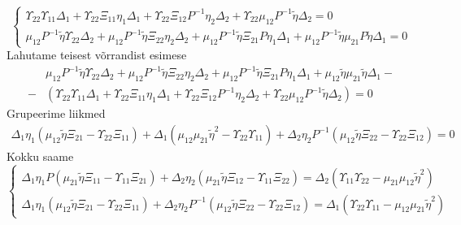 \documentclass[class=article, crop=false]{standalone}
\begin{document}
\begin{equation}\label{key}
	\begin{cases}
		\Upsilon_{22} \Upsilon_{11} \Delta_{1} + \Upsilon_{22} \Xi_{11} \eta_{ 1} \Delta_{1} + \Upsilon_{22} \Xi_{12} P^{-1} \eta_{ 2} \Delta_{2} + \Upsilon_{22} \mu_{12} P^{ -1} \tilde{ \eta} \Delta_{2} = 0 \\
		\mu_{12} P^{-1} \tilde{ \eta} \Upsilon_{22} \Delta_{2} + \mu_{12} P^{-1} \tilde{ \eta} \Xi_{22} \eta_{ 2} \Delta_{2} + \mu_{12} P^{-1} \tilde{ \eta} \Xi_{21} P \eta_{ 1} \Delta_{1} + \mu_{12} P^{-1} \tilde{ \eta} \mu_{21} P \tilde{ \eta} \Delta_{1} = 0
	\end{cases}
\end{equation}
Lahutame teisest võrrandist esimese
\begin{equation}\label{key}
	\begin{split}
		& \mu_{12} P^{-1} \tilde{ \eta} \Upsilon_{22} \Delta_{2} + \mu_{12} P^{-1} \tilde{ \eta} \Xi_{22} \eta_{ 2} \Delta_{2} + \mu_{12} P^{-1} \tilde{ \eta} \Xi_{21} P \eta_{ 1} \Delta_{1} + \mu_{12} \tilde{ \eta} \mu_{21} \tilde{ \eta} \Delta_{1} - \\
		- & (\Upsilon_{22} \Upsilon_{11} \Delta_{1} + \Upsilon_{22} \Xi_{11} \eta_{ 1} \Delta_{1} + \Upsilon_{22} \Xi_{12} P^{-1} \eta_{ 2} \Delta_{2} + \Upsilon_{22} \mu_{12} P^{ -1} \tilde{ \eta} \Delta_{2}) = 0
	\end{split}
\end{equation}
Grupeerime liikmed
\begin{equation}\label{key}
	\begin{split}
		\Delta_{1} \eta_{ 1} ( \mu_{12} \tilde{ \eta} \Xi_{21} - \Upsilon_{22} \Xi_{11}) + \Delta_{1} (\mu_{12} \mu_{21} \tilde{ \eta}^{2} - \Upsilon_{22} \Upsilon_{11}) + \Delta_{2} \eta_{ 2} P^{-1} ( \mu_{12} \tilde{ \eta} \Xi_{22} - \Upsilon_{22} \Xi_{12}) = 0
	\end{split}
\end{equation}
Kokku saame 
\begin{equation}\label{key}
	\begin{cases}
		\Delta_{1} \eta_{ 1} P ( \mu_{21} \tilde{ \eta} \Xi_{11} - \Upsilon_{11} \Xi_{21}) + \Delta_{2} \eta_{ 2} ( \mu_{21} \tilde{ \eta} \Xi_{12} - \Upsilon_{11} \Xi_{22}) = \Delta_{2} ( \Upsilon_{11} \Upsilon_{22} - \mu_{21} \mu_{12} \tilde{ \eta}^{2}) \\
		\Delta_{1} \eta_{ 1} ( \mu_{12} \tilde{ \eta} \Xi_{21} - \Upsilon_{22} \Xi_{11}) + \Delta_{2} \eta_{ 2} P^{-1} ( \mu_{12} \tilde{ \eta} \Xi_{22} - \Upsilon_{22} \Xi_{12}) = \Delta_{1} ( \Upsilon_{22} \Upsilon_{11} - \mu_{12} \mu_{21} \tilde{ \eta}^{2})
	\end{cases}
\end{equation}
\end{document}
